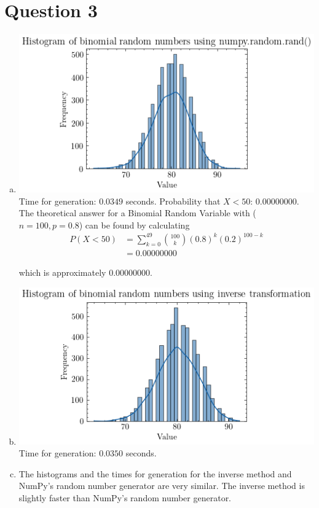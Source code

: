 \documentclass{article}
\begin{document}
\section*{Question 3}
    \begin{enumerate}[(a)]
        \item 
            \includegraphics[scale=0.7]{imgs/binomialrv.png}  \\
            Time for generation: $0.0349$ seconds.
            Probability that $X < 50$: $0.00000000$.
            The theoretical answer for a Binomial Random Variable with ($n = 100, p = 0.8$) can be found by calculating
            \begin{align*}
                P(X < 50) &= \sum_{k=0}^{49} {100 \choose k} (0.8)^k (0.2)^{100-k} \\
                &= 0.00000000
            \end{align*}

            which is approximately $0.00000000$.

        \item
            \includegraphics[scale=0.7]{imgs/binomialinverse.png}  \\
            Time for generation: $0.0350$ seconds.
        \item
            The histograms and the times for generation for the inverse method and NumPy's random number generator are
            very similar. The inverse method is slightly faster than NumPy's random number generator.
    \end{enumerate}
\end{document}
